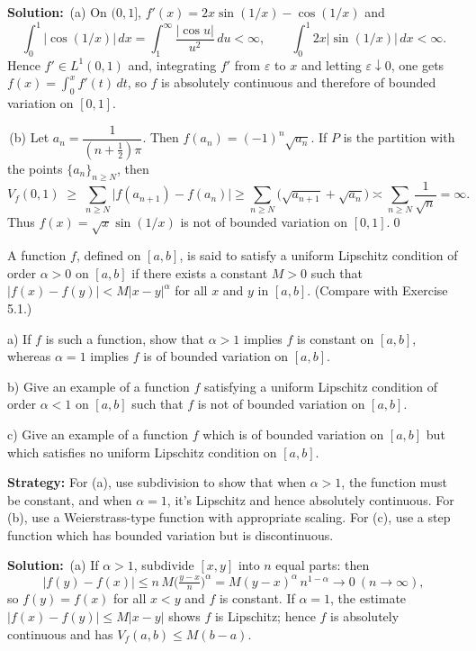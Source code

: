 \bigskip\noindent\textbf{Solution:}
\,(a) On $(0,1]$, $f'(x)=2x\sin(1/x)-\cos(1/x)$ and
\[\int_0^1 |\cos(1/x)|\,dx=\int_1^{\infty}\frac{|\cos u|}{u^2}\,du<\infty,\qquad \int_0^1 2x|\sin(1/x)|\,dx<\infty.
\]
Hence $f'\in L^1(0,1)$ and, integrating $f'$ from $\varepsilon$ to $x$ and letting $\varepsilon\downarrow 0$, one gets $f(x)=\int_0^x f'(t)\,dt$, so $f$ is absolutely continuous and therefore of bounded variation on $[0,1]$.

\,(b) Let $a_n=\dfrac{1}{(n+\tfrac12)\pi}$. Then $f(a_n)=(-1)^n\sqrt{a_n}$. If $P$ is the partition with the points $\{a_n\}_{n\ge N}$, then
\[V_f(0,1)\;\ge\;\sum_{n\ge N}\big|f(a_{n+1})-f(a_n)\big|\ge \sum_{n\ge N}\big(\sqrt{a_{n+1}}+\sqrt{a_n}\big)\asymp\sum_{n\ge N}\frac{1}{\sqrt{n}}=\infty.
\]
Thus $f(x)=\sqrt{x}\sin(1/x)$ is not of bounded variation on $[0,1]$.\qed


\begin{problembox}
\begin{problemstatement}
A function $f$, defined on $[a, b]$, is said to satisfy a uniform Lipschitz condition of order $\alpha > 0$ on $[a, b]$ if there exists a constant $M > 0$ such that $|f(x) - f(y)| < M |x - y|^\alpha$ for all $x$ and $y$ in $[a, b]$. (Compare with Exercise 5.1.)

a) If $f$ is such a function, show that $\alpha > 1$ implies $f$ is constant on $[a, b]$, whereas $\alpha = 1$ implies $f$ is of bounded variation on $[a, b]$.

b) Give an example of a function $f$ satisfying a uniform Lipschitz condition of order $\alpha < 1$ on $[a, b]$ such that $f$ is not of bounded variation on $[a, b]$.

c) Give an example of a function $f$ which is of bounded variation on $[a, b]$ but which satisfies no uniform Lipschitz condition on $[a, b]$.
\end{problemstatement}
\end{problembox}

\noindent\textbf{Strategy:} For (a), use subdivision to show that when $\alpha > 1$, the function must be constant, and when $\alpha = 1$, it's Lipschitz and hence absolutely continuous. For (b), use a Weierstrass-type function with appropriate scaling. For (c), use a step function which has bounded variation but is discontinuous.

\bigskip\noindent\textbf{Solution:}
\,(a) If $\alpha>1$, subdivide $[x,y]$ into $n$ equal parts: then
\[|f(y)-f(x)|\le n\,M\Big(\tfrac{y-x}{n}\Big)^{\!\alpha}=M(y-x)^{\alpha}\,n^{1-\alpha}\to 0\ (n\to\infty),\]
so $f(y)=f(x)$ for all $x<y$ and $f$ is constant. If $\alpha=1$, the estimate $|f(x)-f(y)|\le M|x-y|$ shows $f$ is Lipschitz; hence $f$ is absolutely continuous and has $V_f(a,b)\le M(b-a)$.

